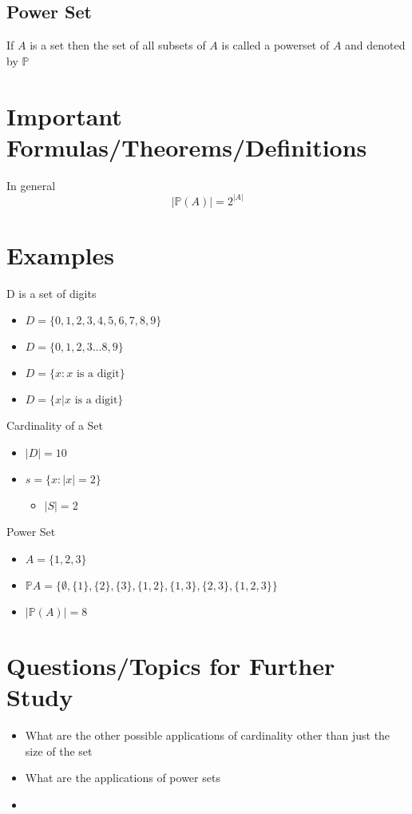 \documentclass[12pt,a4paper]{article}
\begin{document}
\subsection{Power Set}
If \( A \) is a set then the set of all subsets of \( A \) is called a powerset of \( A \) and denoted by \( \mathbb{P} \)
\section{Important Formulas/Theorems/Definitions}
\begin{tcolorbox}[colback=blue!5!white,colframe=blue!75!black,title=Key Formula/Theorem]
  In general \begin{equation}
    |\mathbb{P}(A)| = 2^{|A|}
  \end{equation}
\end{tcolorbox}

\section{Examples}
\begin{tcolorbox}
  D is a set of digits 
  \begin{itemize}
    \item $D = \{0, 1, 2, 3, 4, 5, 6, 7, 8, 9\}$ 
    \item $D = \{0, 1, 2, 3 \ldots 8, 9\}$
    \item \( D = \{ x : x\text{ is a digit} \} \)
    \item \( D = \{ x | x \text { is a digit}\} \)
  \end{itemize}
  Cardinality of a Set 
  \begin{itemize}
    \item \( |D| = 10 \)
    \item  \( s = \{ x: |x| =2 \} \)
      \begin{itemize}
        \item \( |S| = 2 \)
      \end{itemize}
  \end{itemize}
  Power Set
  \begin{itemize}
    \item \( A = \{ 1, 2, 3\} \)
  \item \( \mathbb{P}{A} = \{\emptyset , \{1\}, \{2\}, \{3\}, \{1,2\}, \{1,3\}, \{2,3\}, \{1,2,3\}\} \)
  \item \( |\mathbb{P} (A)| = 8\)
  \end{itemize}
\end{tcolorbox}

\section{Questions/Topics for Further Study}
\begin{itemize}
  \item What are the other possible applications of cardinality other than just the size of the set 
  \item What are the applications of power sets 
  \item 
\end{itemize}
\end{document}
